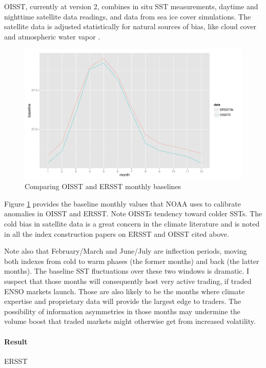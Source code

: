 \documentclass[authoryear]{article}
\begin{document}
OISST, currently at version 2, combines in situ SST measurements, daytime and nighttime satellite data readings, and data from sea ice cover simulations. The satellite data is adjusted statistically for natural sources of bias, like cloud cover and atmospheric water vapor\cite{reynolds2002improved} \cite{reynolds1994improved} \cite{reynolds1993improved} \cite{reynolds1988real}. 

\begin{figure}[!htbp]
  \includegraphics[width=\linewidth]{Pricingfigs/CompareOISSTandERRSTbaselines}
  \caption{Comparing OISST and ERSST monthly baselines}
   \label{fig:baeslinesOIER}
\end{figure}

Figure \ref{fig:baeslinesOIER} provides the baseline monthly values that NOAA uses to calibrate anomalies in OISST and ERSST. Note OISSTs tendency toward colder SSTs. The cold bias in satellite data is a great concern in the climate literature and is noted in all the index construction papers on ERSST and OISST cited above.

Note also that February/March and June/July are inflection periods, moving both indexes from cold to warm phases (the former months) and back (the latter months). The baseline SST fluctuations over these two windows is dramatic. I suspect that those months will consequently host very active trading, if traded ENSO markets launch. Those are also likely to be the months where climate expertise and proprietary data will provide the largest edge to traders. The possibility of information asymmetries in those months may undermine the volume boost that traded markets might otherwise get from increased volatility. 

\paragraph{Result}
ERSST
\end{document}
